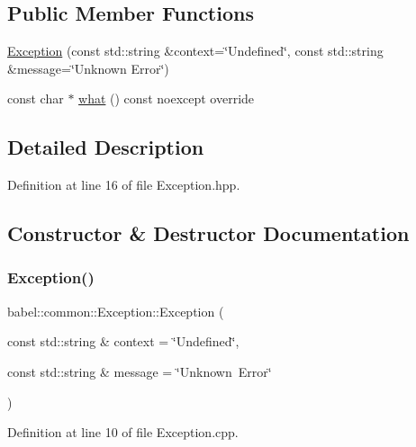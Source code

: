 \subsection*{Public Member Functions}
\begin{DoxyCompactItemize}
\item 
\mbox{\hyperlink{classbabel_1_1common_1_1_exception_a9ebd2831e38c92c5a406289bcc425058}{Exception}} (const std\+::string \&context=\char`\"{}Undefined\char`\"{}, const std\+::string \&message=\char`\"{}Unknown Error\char`\"{})
\item 
const char $\ast$ \mbox{\hyperlink{classbabel_1_1common_1_1_exception_ab18e71922173ed032bd7c59ebe7ac299}{what}} () const noexcept override
\end{DoxyCompactItemize}


\subsection{Detailed Description}


Definition at line 16 of file Exception.\+hpp.



\subsection{Constructor \& Destructor Documentation}
\mbox{\label{classbabel_1_1common_1_1_exception_a9ebd2831e38c92c5a406289bcc425058}} 
\subsubsection{\texorpdfstring{Exception()}{Exception()}}
{\footnotesize\ttfamily babel\+::common\+::\+Exception\+::\+Exception (\begin{DoxyParamCaption}\item[{const std\+::string \&}]{context = {\ttfamily \char`\"{}Undefined\char`\"{}},  }\item[{const std\+::string \&}]{message = {\ttfamily \char`\"{}Unknown~Error\char`\"{}} }\end{DoxyParamCaption})\hspace{0.3cm}{\ttfamily [explicit]}}



Definition at line 10 of file Exception.\+cpp.



